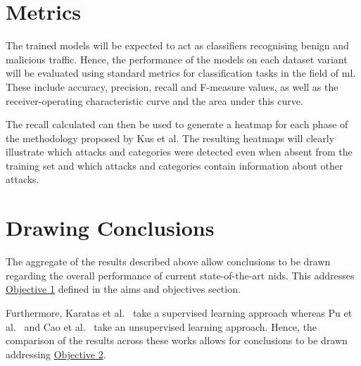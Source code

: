 \section{Metrics}%
\label{sec:metrics}

The trained models will be expected to act as classifiers recognising benign
and malicious traffic. Hence, the performance of the models on each dataset
variant will be evaluated using standard metrics for classification tasks in
the field of \gls{ml}. These include accuracy, precision, recall and F-measure
values, as well as the receiver-operating characteristic curve and the area
under this curve.~\cite{metrics}

The recall calculated can then be used to generate a heatmap for each phase of
the methodology proposed by Kus et al. The resulting heatmaps will clearly
illustrate which attacks and categories were detected even when absent from the
training set and which attacks and categories contain information about other
attacks.

\section{Drawing Conclusions}%
\label{sec:conclusions}

The aggregate of the results described above allow conclusions to be drawn
regarding the overall performance of current state-of-the-art \gls{nids}. This
addresses \hyperlink{obj}{Objective 1} defined in the aims and objectives
section.

Furthermore, Karatas et al.~\cite{Karatas} take a supervised learning approach
whereas Pu et al.~\cite{Pu} and Cao et al.~\cite{Cao} take an unsupervised
learning approach. Hence, the comparison of the results across these works
allows for conclusions to be drawn addressing \hyperlink{obj}{Objective 2}.
